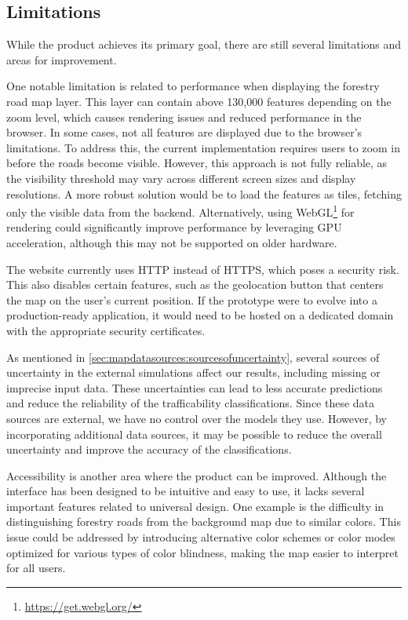\subsection{Limitations}

While the product achieves its primary goal, there are still several limitations and areas for improvement.

One notable limitation is related to performance when displaying the forestry road map layer. This layer can contain above 130,000 features depending on the zoom level, which causes rendering issues and reduced performance in the browser. In some cases, not all features are displayed due to the browser's limitations. To address this, the current implementation requires users to zoom in before the roads become visible. However, this approach is not fully reliable, as the visibility threshold may vary across different screen sizes and display resolutions. A more robust solution would be to load the features as tiles, fetching only the visible data from the backend. Alternatively, using WebGL\footnote{\url{https://get.webgl.org/}} for rendering could significantly improve performance by leveraging GPU acceleration, although this may not be supported on older hardware.

The website currently uses HTTP instead of HTTPS, which poses a security risk. This also disables certain features, such as the geolocation button that centers the map on the user's current position. If the prototype were to evolve into a production-ready application, it would need to be hosted on a dedicated domain with the appropriate security certificates.

As mentioned in \autoref{sec:mapdatasources:sourcesofuncertainty}, several sources of uncertainty in the external simulations affect our results, including missing or imprecise input data. These uncertainties can lead to less accurate predictions and reduce the reliability of the trafficability classifications. Since these data sources are external, we have no control over the models they use. However, by incorporating additional data sources, it may be possible to reduce the overall uncertainty and improve the accuracy of the classifications.

Accessibility is another area where the product can be improved. Although the interface has been designed to be intuitive and easy to use, it lacks several important features related to universal design. One example is the difficulty in distinguishing forestry roads from the background map due to similar colors. This issue could be addressed by introducing alternative color schemes or color modes optimized for various types of color blindness, making the map easier to interpret for all users.

